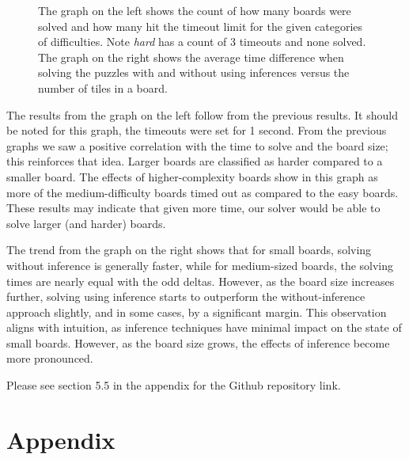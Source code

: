 \documentclass{article}
\theoremstyle{definition}
\begin{document}
\begin{figure}[H]
\begin{minipage}{0.49\textwidth}
\end{minipage}
\caption{The graph on the left shows the count of how many boards were solved and how many hit the timeout limit for the given categories of difficulties. Note \textit{hard} has a count of 3 timeouts and none solved. The graph on the right shows the average time difference when solving the puzzles with and without using inferences versus the number of tiles in a board. }
\end{figure}
The results from the graph on the left follow from the previous results. It should be noted for this graph, the timeouts were set for 1 second. From the previous graphs we saw a positive correlation with the time to solve and the board size; this reinforces that idea. Larger boards are classified as harder compared to a smaller board. The effects of higher-complexity boards show in this graph as more of the medium-difficulty boards timed out as compared to the easy boards. 
These results may indicate that given more time, our solver would be able to solve larger (and harder) boards.


The trend from the graph on the right shows that for small boards, solving without inference is generally faster, while for medium-sized boards, the solving times are nearly equal with the odd deltas. However, as the board size increases further, solving using inference starts to outperform the without-inference approach slightly, and in some cases, by a significant margin. This observation aligns with intuition, as inference techniques have minimal impact on the state of small boards. However, as the board size grows, the effects of inference become more pronounced.


Please see section 5.5 in the appendix for the Github repository link.



\section{Appendix}

\end{document}
